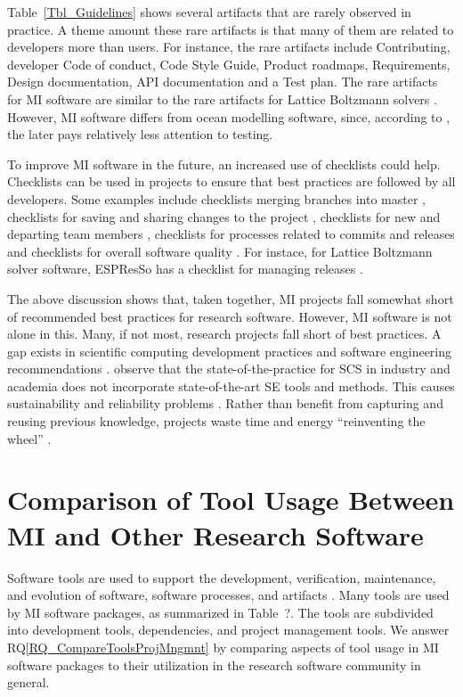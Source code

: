 \documentclass[final, 3p, times, authoryear]{elsarticle}
\newcommand{\rqref}[1]{RQ\ref{#1}}
\begin{document}
Table~\ref{Tbl_Guidelines} shows several artifacts that are rarely observed in
practice.  A theme amount these rare artifacts is that many of them are related
to developers more than users.  For instance, the rare artifacts include
Contributing, developer Code of conduct, Code Style Guide, Product roadmaps,
Requirements, Design documentation, API documentation and a Test plan.  The rare
artifacts for MI software are similar to the rare artifacts for Lattice
Boltzmann solvers \citep{Michalski2021}.  However, MI software differs from
ocean modelling software, since, according to \citep{JungEtAl2022}, the later
pays relatively less attention to testing.

To improve MI software in the future, an increased use of checklists could help.
Checklists can be used in projects to ensure that best practices are followed by
all developers.  Some examples include checklists merging branches into master
\citep{Brown2015}, checklists for saving and sharing changes to the project
\citep{WilsonEtAl2016}, checklists for new and departing team members
\citep{HerouxAndBernholdt2018}, checklists for processes related to commits and
releases \citep{HerouxEtAl2008} and checklists for overall software quality
\citep{ThielEtAl2020, SSI2022}.  For instace, for Lattice Boltzmann solver
software, ESPResSo has a checklist for managing releases \citep{Michalski2021}.

The above discussion shows that, taken together, MI projects fall somewhat short
of recommended best practices for research software.  However, MI software is
not alone in this.  Many, if not most, research projects fall short of best
practices.  A gap exists in scientific computing development practices and
software engineering recommendations \citep{Storer2017, Kelly2007,
OwojaiyeEtAl2021_CSE}. \citet{JohansonAndHasselbring2018} observe that the
state-of-the-practice for SCS in industry and academia does not incorporate
state-of-the-art SE tools and methods.  This causes sustainability and
reliability problems \citep{FaulkEtAl2009}. Rather than benefit from capturing
and reusing previous knowledge, projects waste time and energy ``reinventing the
wheel'' \citep{deSouzaEtAl2019}.

\section{Comparison of Tool Usage Between MI and Other Research Software}
\label{Sec_CompareTools}

Software tools are used to support the development, verification, maintenance,
and evolution of software, software processes, and artifacts \citep[p.\
501]{GhezziEtAl2003}. Many tools are used by MI software packages, as summarized
in Table~?.  The tools are subdivided into development tools, dependencies, and
project management tools.  We answer \rqref{RQ_CompareToolsProjMngmnt} by
comparing aspects of tool usage in MI software packages to their utilization in
the research software community in general.
\end{document}

